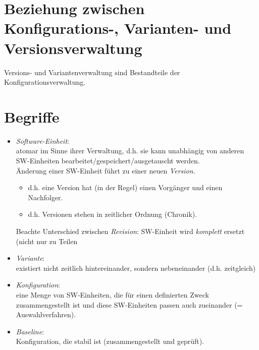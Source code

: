 \section{Beziehung zwischen Konfigurations-, Varianten- und Versionsverwaltung}
Versions- und Variantenverwaltung sind Bestandteile der Konfigurationsverwaltung.

\section{Begriffe}
\begin{itemize}
\item \emph{Software-Einheit}:\\
atomar im Sinne ihrer Verwaltung, d.h. sie kann unabhängig von anderen SW-Einheiten bearbeitet/gespeichert/ausgetauscht werden.\\
Änderung einer SW-Einheit führt zu einer neuen \emph{Version}.
\begin{itemize}[label=$\rightarrow$]
\item d.h. eine Version hat (in der Regel) einen Vorgänger und einen Nachfolger.
\item d.h. Versionen stehen in zeitlicher Ordnung (Chronik).
\end{itemize}
Beachte Unterschied zwischen \emph{Revision}: SW-Einheit wird \emph{komplett} ersetzt (nicht nur zu Teilen
\item \emph{Variante}:\\
existiert nicht zeitlich hintereinander, sondern nebeneinander (d.h. zeitgleich)
\item \emph{Konfiguration}:\\
eine Menge von SW-Einheiten, die für einen definierten Zweck zusammengestellt ist und diese SW-Einheiten passen auch zueinander (= Auswahlverfahren).
\item \emph{Baseline}:\\
Konfiguration, die stabil ist (zusammengestellt und geprüft).
\end{itemize}

